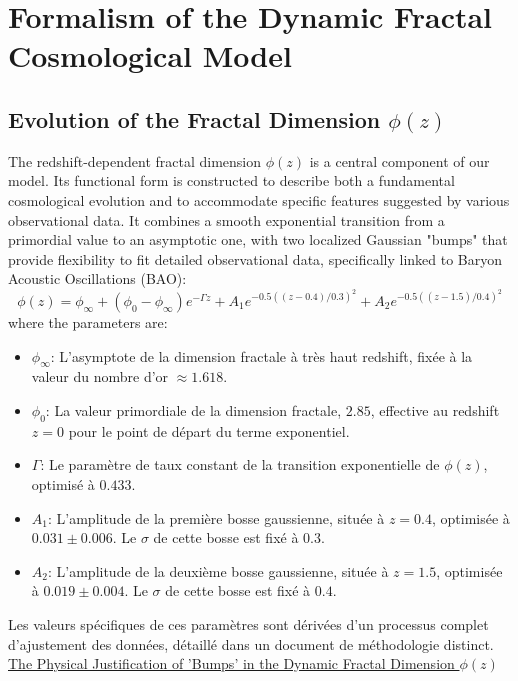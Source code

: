 \documentclass[aps,prl,twocolumn,groupedaddress]{revtex4-2}
\newcommand{\optGammaVal}{0.433}
\begin{document}
\section{Formalism of the Dynamic Fractal Cosmological Model}

\subsection{Evolution of the Fractal Dimension $\phi(z)$}
The redshift-dependent fractal dimension $\phi(z)$ is a central component of our model. Its functional form is constructed to describe both a fundamental cosmological evolution and to accommodate specific features suggested by various observational data. It combines a smooth exponential transition from a primordial value to an asymptotic one, with two localized Gaussian "bumps" that provide flexibility to fit detailed observational data, specifically linked to Baryon Acoustic Oscillations (BAO):
$$
\phi(z) = \phi_{\infty} + (\phi_0 - \phi_{\infty}) e^{-\Gamma z} + A_1 e^{-0.5((z - 0.4)/0.3)^2} + A_2 e^{-0.5((z - 1.5)/0.4)^2}
$$
where the parameters are:
\begin{itemize}
    \item $\phi_{\infty}$: L'asymptote de la dimension fractale à très haut redshift, fixée à la valeur du nombre d'or $\approx 1.618$.
    \item $\phi_0$: La valeur primordiale de la dimension fractale, $2.85$, effective au redshift $z=0$ pour le point de départ du terme exponentiel.
    \item $\Gamma$: Le paramètre de taux constant de la transition exponentielle de $\phi(z)$, optimisé à $\optGammaVal$.
    \item $A_1$: L'amplitude de la première bosse gaussienne, située à $z=0.4$, optimisée à $0.031 \pm 0.006$. Le $\sigma$ de cette bosse est fixé à $0.3$.
    \item $A_2$: L'amplitude de la deuxième bosse gaussienne, située à $z=1.5$, optimisée à $0.019 \pm 0.004$. Le $\sigma$ de cette bosse est fixé à $0.4$.
\end{itemize}
Les valeurs spécifiques de ces paramètres sont dérivées d'un processus complet d'ajustement des données, détaillé dans un document de méthodologie distinct.
\href{methods/physical_justification_phi_z_bumps.pdf}{The Physical Justification of 'Bumps' in the Dynamic Fractal Dimension $\phi(z)$}
\end{document}
